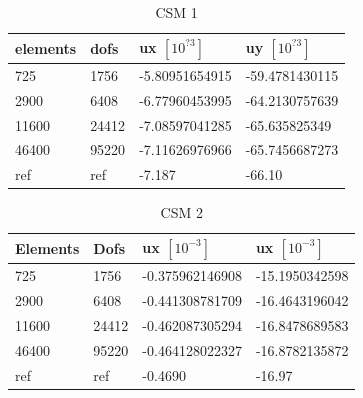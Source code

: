 \begin{table}[h!]
\centering
\caption{CSM 1}
\label{my-label}
\begin{tabular}{|l|l|l|l|}
\hline
elements & dofs & ux $[10^{?3}]$ & uy $[10^{?3}]$ \\ \hline
725 & 1756 & -5.80951654915 & -59.4781430115 \\ \hline
2900 & 6408 & -6.77960453995 & -64.2130757639 \\ \hline
11600 & 24412 & -7.08597041285 & -65.635825349 \\ \hline
46400 & 95220 & -7.11626976966 & -65.7456687273 \\ \hline
ref & ref & -7.187 & -66.10 \\ \hline
\end{tabular}
\end{table}

\begin{table}[]
\centering
\caption{CSM 2}
\label{my-label}
\begin{tabular}{@{}|l|l|l|l|@{}}
\hline
Elements & Dofs & ux $[10^{-3}] $& ux $[10^{-3}] $\\ \hline
725 &  1756 & -0.375962146908 & -15.1950342598 \\ \hline
2900 & 6408 & -0.441308781709 & -16.4643196042\\ \hline
11600 & 24412 & -0.462087305294 & -16.8478689583 \\ \hline
46400 & 95220 & -0.464128022327 & -16.8782135872\\ \hline
ref & ref & -0.4690 & -16.97 \\ \hline
\end{tabular}
\end{table}


